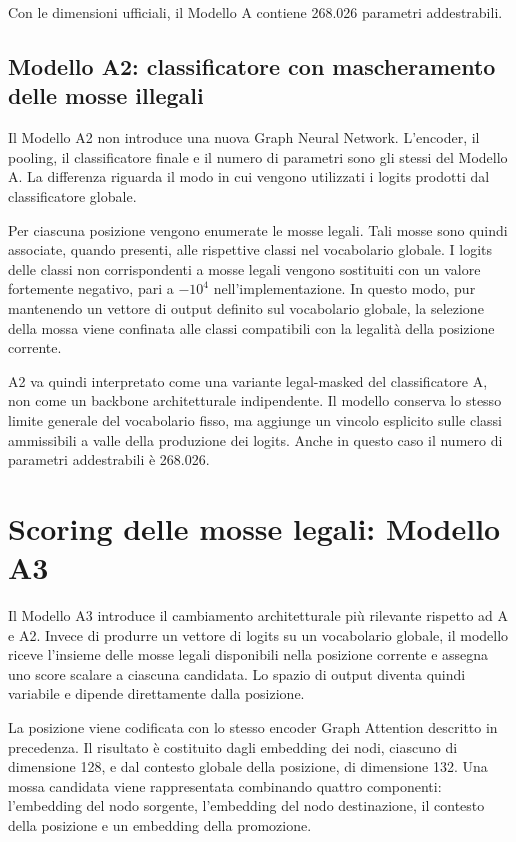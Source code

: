 Con le dimensioni ufficiali, il Modello A contiene 268.026 parametri addestrabili.

\subsection{Modello A2: classificatore con mascheramento delle mosse illegali}

Il Modello A2 non introduce una nuova Graph Neural Network. L'encoder, il pooling, il classificatore finale e il numero di parametri sono gli stessi del Modello A. La differenza riguarda il modo in cui vengono utilizzati i logits prodotti dal classificatore globale.

Per ciascuna posizione vengono enumerate le mosse legali. Tali mosse sono quindi associate, quando presenti, alle rispettive classi nel vocabolario globale. I logits delle classi non corrispondenti a mosse legali vengono sostituiti con un valore fortemente negativo, pari a \(-10^4\) nell'implementazione. In questo modo, pur mantenendo un vettore di output definito sul vocabolario globale, la selezione della mossa viene confinata alle classi compatibili con la legalit\`a della posizione corrente.

A2 va quindi interpretato come una variante legal-masked del classificatore A, non come un backbone architetturale indipendente. Il modello conserva lo stesso limite generale del vocabolario fisso, ma aggiunge un vincolo esplicito sulle classi ammissibili a valle della produzione dei logits. Anche in questo caso il numero di parametri addestrabili \`e 268.026.

\section{Scoring delle mosse legali: Modello A3}

Il Modello A3 introduce il cambiamento architetturale pi\`u rilevante rispetto ad A e A2. Invece di produrre un vettore di logits su un vocabolario globale, il modello riceve l'insieme delle mosse legali disponibili nella posizione corrente e assegna uno score scalare a ciascuna candidata. Lo spazio di output diventa quindi variabile e dipende direttamente dalla posizione.

La posizione viene codificata con lo stesso encoder Graph Attention descritto in precedenza. Il risultato \`e costituito dagli embedding dei nodi, ciascuno di dimensione 128, e dal contesto globale della posizione, di dimensione 132. Una mossa candidata viene rappresentata combinando quattro componenti: l'embedding del nodo sorgente, l'embedding del nodo destinazione, il contesto della posizione e un embedding della promozione.

